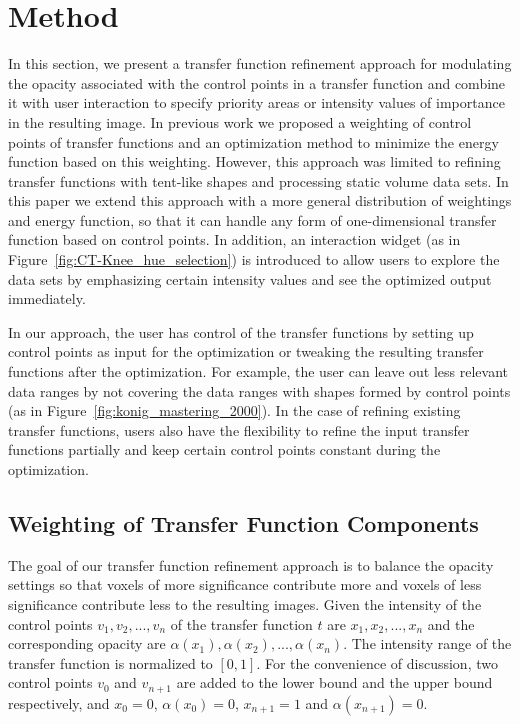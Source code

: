 \section{Method}
In this section, we present a transfer function refinement approach for modulating the opacity associated with the control points in a transfer function and combine it with user interaction to specify priority areas or intensity values of importance in the resulting image. In previous work \cite{luo_information-guided_2014} we proposed a weighting of control points of transfer functions and an optimization method to minimize the energy function based on this weighting. However, this approach was limited to refining transfer functions with tent-like shapes and processing static volume data sets. 
In this paper we extend this approach with a more general distribution of weightings and energy function, so that it can handle any form of one-dimensional transfer function based on control points. In addition, an interaction widget (as in Figure~\ref{fig:CT-Knee_hue_selection}) is introduced to allow users to explore the data sets by emphasizing certain intensity values and see the optimized output immediately.

In our approach, the user has control of the transfer functions by setting up control points as input for the optimization or tweaking the resulting transfer functions after the optimization. For example, the user can leave out less relevant data ranges by not covering the data ranges with shapes formed by control points (as in Figure~\ref{fig:konig_mastering_2000}). In the case of refining existing transfer functions, users also have the flexibility to refine the input transfer functions partially and keep certain control points constant during the optimization.

\subsection{Weighting of Transfer Function Components}
The goal of our transfer function refinement approach is to balance the opacity settings so that voxels of more significance contribute more and voxels of less significance contribute less to the resulting images.
Given the intensity of the control points $ v_{1},v_{2},...,v_{n} $ of the transfer function $ t $ are $ x_{1},x_{2},...,x_{n} $ and the corresponding opacity are $ \alpha(x_{1}),\alpha(x_{2}),...,\alpha(x_{n}) $. The intensity range of the transfer function is normalized to $ [0,1] $.
For the convenience of discussion, two control points $ v_{0} $ and $ v_{n+1} $ are added to the lower bound and the upper bound respectively, and $ x_{0}=0 $, $ \alpha(x_{0})=0 $, $ x_{n+1}=1 $ and $ \alpha(x_{n+1})=0 $.

